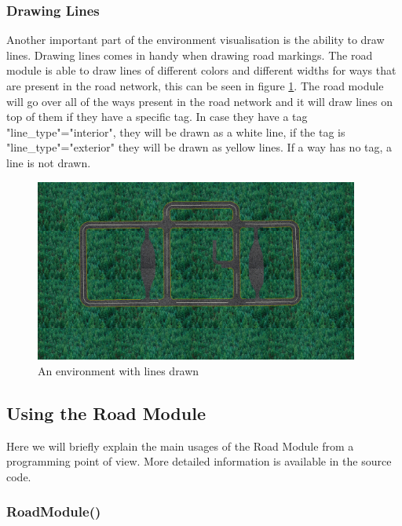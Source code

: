 \subsubsection{Drawing Lines}

Another important part of the environment visualisation is the ability to draw lines. Drawing lines comes in handy when drawing road markings. The road module is able to draw lines of different colors and different widths for ways that are present in the road network, this can be seen in figure \ref{fig:visualisation_background_and_roads_and_markings}. The road module will go over all of the ways present in the road network and it will draw lines on top of them if they have a specific tag. In case they have a tag "line\_type"="interior", they will be drawn as a white line, if the tag is "line\_type"="exterior" they will be drawn as yellow lines. If a way has no tag, a line is not drawn. 

\begin{figure}[h!]
  \centering
    \includegraphics[width=0.95\textwidth]{visualisation_background_and_roads_and_markings}
    \caption{An environment with lines drawn \label{fig:visualisation_background_and_roads_and_markings} }
\end{figure}

\subsection{Using the Road Module}

Here we will briefly explain the main usages of the Road Module from a programming point of view. More detailed information is available in the source code.


\subsubsection{RoadModule()}

